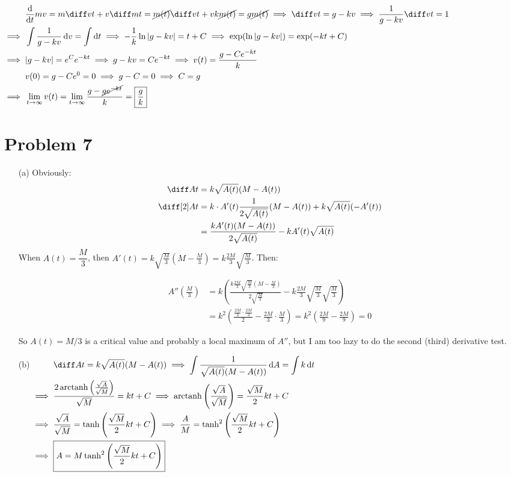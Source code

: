 \documentclass[preview, margin=0.6in]{standalone}
\newcommand*{\problem}[1]{\section*{Problem #1}}
\newcommand*{\deriv}[1][x]{\ensuremath{\dfrac{\mathrm{d}}{\mathrm{d}#1}}}
\DeclareMathOperator{\arctanh}{arctanh}
\begin{document}
$\begin{aligned}[t]
	& \deriv[t]mv
	=m\diff vt+v\diff mt=\cancel{m(t)}\diff vt+vk\cancel{m(t)}=g\cancel{m(t)}
	\implies \diff vt=g-kv
	\implies \frac{1}{g-kv}\diff vt=1 \\
	\implies{}& \int \frac{1}{g-kv}\,\mathrm{d}v=\int\mathrm{d}t
	\implies -\frac1k\ln|g-kv|=t+C
	\implies \exp(\ln|g-kv|)=\exp(-kt+C) \\
	\implies{}& |g-kv|=e^Ce^{-kt}
	\implies g-kv=Ce^{-kt}
	\implies v(t)=\frac{g-Ce^{-kt}}k \\
	&v(0)=g-Ce^{0}=0
	\implies g-C=0
	\implies C=g \\
	\implies{}& \lim_{t\to \infty}v(t)=\lim_{t\to \infty}\frac{g-\cancel{ge^{-kt}}}k=\boxed{\frac gk}
\end{aligned}$

\problem{7}
\begin{itemize}
	\item[(a)] Obviously:
		\begin{align*}
			\diff At&=k \sqrt{A(t)}(M-A(t)) \\
			\diff[2]At&=k\cdot A'(t) \frac{1}{2 \sqrt{A(t)}} (M-A(t))+k \sqrt{A(t)}(-A'(t)) \\
					  &=\frac{kA'(t)(M-A(t))}{2 \sqrt{A(t)}}-kA'(t) \sqrt{A(t)}
		\end{align*}
		When $A(t)=\dfrac M3$, then $\displaystyle A'(t)=k \sqrt{\frac M3} \left(M-\frac M3\right)=k \frac{2M}{3}\sqrt{\frac M3}$. Then:

		\begin{align*}
		    A''\left(\frac M3\right)
			&=k \left(\frac{k \frac{2M}{3}\sqrt{\frac M3} \left(M-\frac M3\right)}{2 \sqrt{\frac M3}}-k \frac{2M}{3}\sqrt{\frac M3} \sqrt{\frac{M}{3}}\right) \\
			&=k^2 \left(\frac{\frac{2M}{3}\cdot \frac{2M}{3}}{2}-\frac{2M}{3}\cdot \frac M3\right)
			=k^2 \left(\frac{2M}{9}-\frac{2M}{9}\right)
			=0
		\end{align*}

		So $A(t)=M/3$ is a critical value and probably a local maximum of $A''$, but I am too lazy to do the second (third) derivative test.

	\item[(b)]
		$\begin{aligned}[t]
			&\diff At=k \sqrt{A(t)}(M-A(t))
			\implies \int\frac{1}{\sqrt{A(t)}(M-A(t))}\,\mathrm{d}A=\int k \,\mathrm{d}t \\
			\implies{}& \frac{2\arctanh \left(\frac{\sqrt{A}}{\sqrt{M}}\right)}{\sqrt{M}}=kt+C
			\implies \arctanh \left(\frac{\sqrt{A}}{\sqrt{M}}\right)=\frac{\sqrt{M}}{2}kt+C \\
			\implies{}&\frac{\sqrt{A}}{\sqrt{M}}=\tanh \left(\frac{\sqrt{M}}{2}kt+C\right)
			\implies \frac{A}{M}=\tanh^2 \left(\frac{\sqrt{M}}{2}kt+C\right) \\
			\implies{}& \boxed{A=M\tanh^2 \left(\frac{\sqrt{M}}{2}kt+C\right)}
		\end{aligned}$
\end{itemize}
\end{document}
